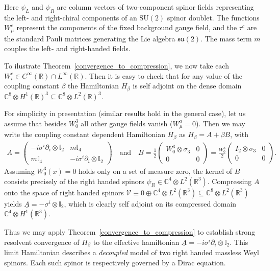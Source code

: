 \documentclass[reqno,12pt,letterpaper]{amsart}
\numberwithin{equation}{section}
\newcommand{\1}{\mathds{1}}
\theoremstyle{definition}
\begin{document}
	Here  \(\psi_L\) and \(\psi_R\) are column vectors of two-component spinor fields representing the left- and right-chiral components of an \(\mathrm{SU}(2)\) spinor doublet. The functions \(W_\mu^c\) represent the components of the fixed background gauge field, and the \(\tau^c\) are the standard Pauli matrices generating the Lie algebra \(\mathfrak{su}(2)\). The mass term \(m\) couples the left- and right-handed fields. 
	
	To ilustrate Theorem~\ref{convergence_to_compression}, we now take each $W^c_i \in C^\infty(\mathds{R})\cap L^\infty(\mathds{R})$. Then it is easy to check that for any value of the coupling constant $\beta$ the Hamiltonian $H_\beta$ is self adjoint on the dense domain $\mathds{C}^8 \otimes H^{1}(\mathds{R})^3 \subseteq \mathds{C}^8 \otimes L^{2}(\mathds{R})^3$.
	
	For simplicity in presentation (similar results hold in the general case), let us assume that besides $W^3_0$ all other gauge fields vanish ($W_\mu^a =0$). Then we may write the coupling constant dependent Hamiltonian $H_\beta$ as $H_\beta = A + \beta B$, with
	\begin{align}
		A = 	\begin{pmatrix}
			- i \sigma^i  \partial_i \otimes \mathbb{I}_2 
			& m \mathbb{I}_4 \\
			m \mathbb{I}_4 & -i \sigma^i \partial_i \otimes \mathbb{I}_2
		\end{pmatrix}
		\quad \text{and} \quad
		B =\frac{1}{2} \begin{pmatrix}
			W_0^3 \otimes \sigma_3
			& 0\\
			0&  0
		\end{pmatrix}
		= \frac{W_0^3 }{2} \begin{pmatrix}
			I_2 \otimes \sigma_3 & 0 \\
			0 & 0
		\end{pmatrix}.
	\end{align}
	Assuming $W_0^3 (x) = 0$ holds only on a set of measure zero, the kernel of $B$ consists precisely of the right handed spinors $\psi_R \in \mathds{C}^4 \otimes L^2(\mathds{R}^3)$. Compressing $A$ onto the space of right handed spinors $\mathscr{V} \equiv 0 \oplus  \mathds{C}^4 \otimes L^2(\mathds{R}^3) \subseteq  \mathds{C}^8 \otimes L^2(\mathds{R}^3)$ yields $
	\underline{A} = -\sigma^i \otimes \mathbb{I}_2$,
	which is clearly self adjoint on its compressed domain $\mathds{C}^4 \otimes H^1(\mathds{R}^3)$.
	
	Thus we may apply Theorem~\ref{convergence_to_compression} to establish strong resolvent convergence of $H_\beta$ to the effective hamiltonian $\underline{A} =  -i\sigma^i \partial_i \otimes \mathbb{I}_2$. This limit Hamiltonian  describes a \textit{decoupled} model of two right handed  massless Weyl spinors. Each such spinor is respectively  governed by a Dirac equation.
\end{document}
